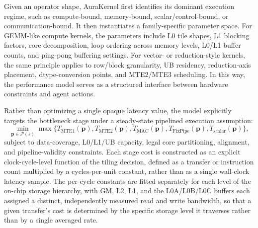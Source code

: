 Given an operator shape, AuraKernel first identifies its dominant execution regime, such as compute-bound, memory-bound, scalar/control-bound, or communication-bound. It then instantiates a family-specific parameter space. For GEMM-like compute kernels, the parameters include L0 tile shapes, L1 blocking factors, core decomposition, loop ordering across memory levels, L0/L1 buffer counts, and ping-pong buffering settings. For vector- or reduction-style kernels, the same principle applies to row/block granularity, UB residency, reduction-axis placement, dtype-conversion points, and MTE2/MTE3 scheduling. In this way, the performance model serves as a structured interface between hardware constraints and agent actions.

Rather than optimizing a single opaque latency value, the model explicitly targets the bottleneck stage under a steady-state pipelined execution assumption:
\begin{equation}
\min_{\mathbf{p}\in\mathcal{P}(s)}
\max\Big\{T_{\mathrm{MTE1}}(\mathbf{p}),T_{\mathrm{MTE2}}(\mathbf{p}),
T_{\mathrm{MAC}}(\mathbf{p}),T_{\mathrm{FixPipe}}(\mathbf{p}),T_{\mathrm{scalar}}(\mathbf{p})\Big\},
\end{equation}
subject to data-coverage, L0/L1/UB capacity, legal core partitioning, alignment, and pipeline-validity constraints. Each stage cost is constructed as an explicit clock-cycle-level function of the tiling decision, defined as a transfer or instruction count multiplied by a cycles-per-unit constant, rather than as a single wall-clock latency sample. The per-cycle constants are fitted separately for each level of the on-chip storage hierarchy, with GM, L2, L1, and the L0A/L0B/L0C buffers each assigned a distinct, independently measured read and write bandwidth, so that a given transfer's cost is determined by the specific storage level it traverses rather than by a single averaged rate.

